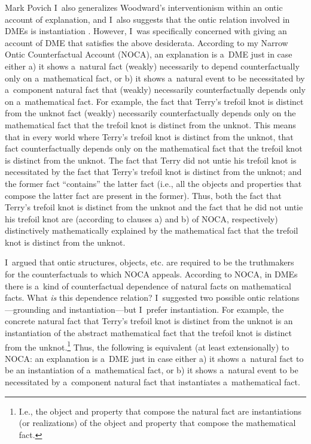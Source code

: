 \begin{artengenv}{Mark Povich}
I~also generalizes Woodward's interventionism within an ontic account of explanation, and I~also suggests that the ontic relation involved in DMEs is instantiation
\parencites*[][]{povich_minimal_2018}[][]{priest_note_2021}. %
 However, I~was specifically concerned with giving an account of DME that satisfies the above desiderata. According to my Narrow Ontic Counterfactual Account (NOCA), an explanation is a~DME just in case either a) it shows a~natural fact (weakly) necessarily to depend counterfactually only on a~mathematical fact, or b) it shows a~natural event to be necessitated by a~component natural fact that (weakly) necessarily counterfactually depends only on a~mathematical fact. For example, the fact that Terry's trefoil knot is distinct from the unknot fact (weakly) necessarily counterfactually depends only on the mathematical fact that the trefoil knot is distinct from the unknot. This means that in every world where Terry's trefoil knot is distinct from the unknot, that fact counterfactually depends only on the mathematical fact that the trefoil knot is distinct from the unknot. The fact that Terry did not untie his trefoil knot is necessitated by the fact that Terry's trefoil knot is distinct from the unknot; and the former fact ``contains'' the latter fact (i.e., all the objects and properties that compose the latter fact are present in the former). Thus, both the fact that Terry's trefoil knot is distinct from the unknot and the fact that he did not untie his trefoil knot are (according to clauses a) and b) of NOCA, respectively) distinctively mathematically explained by the mathematical fact that the trefoil knot is distinct from the unknot.

I~argued that ontic structures, objects, etc. are required to be the truthmakers for the counterfactuals to which NOCA appeals. According to NOCA, in DMEs there is a~kind of counterfactual dependence of natural facts on mathematical facts. What \textit{is} this dependence relation? I~suggested two possible ontic relations---grounding and instantiation---but I~prefer instantiation. For example, the concrete natural fact that Terry's trefoil knot is distinct from the unknot is an instantiation of the abstract mathematical fact that the trefoil knot is distinct from the unknot.\footnote{I.e., the object and property that compose the natural fact are instantiations (or realizations) of the object and property that compose the mathematical fact.} Thus, the following is equivalent (at least extensionally) to NOCA: an explanation is a~DME just in case either a) it shows a~natural fact to be an instantiation of a~mathematical fact, or b) it shows a~natural event to be necessitated by a~component natural fact that instantiates a~mathematical fact.


\end{artengenv}
